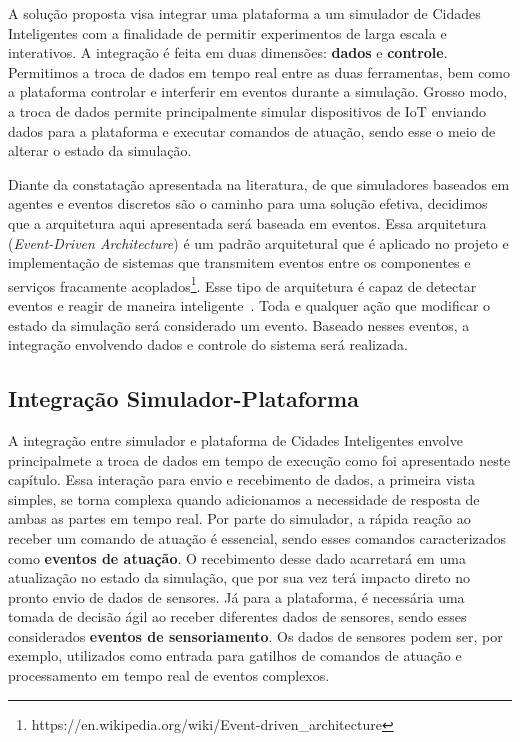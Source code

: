 A solução proposta visa integrar uma plataforma a um simulador de Cidades Inteligentes com a finalidade de permitir experimentos de larga escala e interativos.
A integração é feita em duas dimensões: \textbf{dados} e \textbf{controle}.
Permitimos a troca de dados em tempo real entre as duas ferramentas, bem como a plataforma controlar e interferir em eventos durante a simulação.
Grosso modo, a troca de dados permite principalmente simular dispositivos de IoT enviando dados para a plataforma e executar comandos de atuação, sendo esse o meio de alterar o estado da simulação.

Diante da constatação apresentada na literatura, de que simuladores baseados em agentes e eventos discretos são o caminho para uma solução efetiva, decidimos que a arquitetura aqui apresentada será baseada em eventos.
Essa arquitetura (\textit{Event-Driven Architecture}) é um padrão arquitetural que é aplicado no projeto e implementação de sistemas que transmitem eventos entre os componentes e
serviços fracamente acoplados\footnote{https://en.wikipedia.org/wiki/Event-driven\_architecture}.
Esse tipo de arquitetura é capaz de detectar eventos e reagir de maneira inteligente~\citep{taylor_2009}.
Toda e qualquer ação que modificar o estado da simulação será considerado um evento.
Baseado nesses eventos, a integração envolvendo dados e controle do sistema será realizada.


\subsection{Integração Simulador-Plataforma}

A integração entre simulador e plataforma de Cidades Inteligentes envolve principalmete a troca de dados em tempo de execução como foi apresentado neste capítulo.
Essa interação para envio e recebimento de dados, a primeira vista simples, se torna complexa quando adicionamos a necessidade de resposta de ambas as partes em tempo real.
Por parte do simulador, a rápida reação ao receber um comando de atuação é essencial, sendo esses comandos caracterizados como \textbf{eventos de atuação}.
O recebimento desse dado acarretará em uma atualização no estado da simulação, que por sua vez terá impacto direto no pronto envio de dados de sensores.
Já para a plataforma, é necessária uma tomada de decisão ágil ao receber diferentes dados de sensores, sendo esses considerados \textbf{eventos de sensoriamento}.
Os dados de sensores podem ser, por exemplo, utilizados como entrada para gatilhos de comandos de atuação e processamento em tempo real de eventos complexos.

